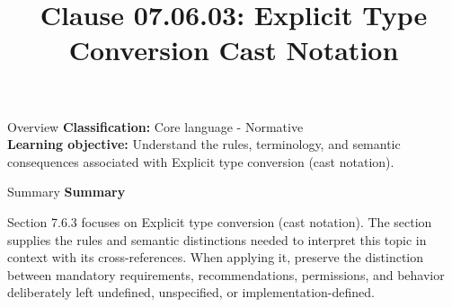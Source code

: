 \documentclass[10pt,letterpaper]{article}
\title{Clause 07.06.03: Explicit Type Conversion Cast Notation}
\author{}
\date{}
\begin{document}
\maketitle
\begin{CornellOverviewBox}{Overview}
\textbf{Classification:} Core language - Normative\\[2pt]
\textbf{Learning objective:} Understand the rules, terminology, and semantic consequences associated with Explicit type conversion (cast notation).
\end{CornellOverviewBox}\begin{CornellSummaryBox}{Summary}
{\sffamily\bfseries\color{Accent} Summary}\par\vspace{3pt}Section 7.6.3 focuses on Explicit type conversion (cast notation). The section supplies the rules and semantic distinctions needed to interpret this topic in context with its cross-references. When applying it, preserve the distinction between mandatory requirements, recommendations, permissions, and behavior deliberately left undefined, unspecified, or implementation-defined.
\end{CornellSummaryBox}
\end{document}
